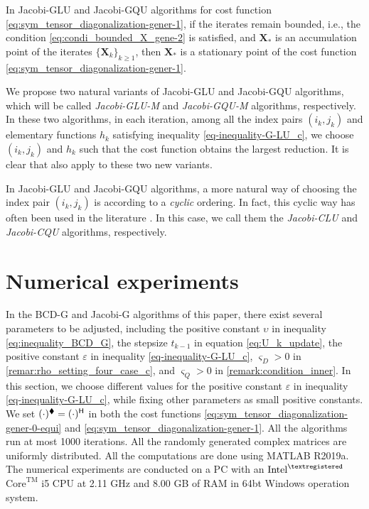 \documentclass[final,onefignum,onetabnum]{siamart190516}
\newcommand{\matr}[1]{\boldsymbol{#1}}
\renewcommand{\H}{{\sf H}} %
\renewcommand{\H}{{\sf H}}      %
\renewcommand{\TH}{{\blacklozenge}}
\begin{document}
\begin{theorem}\label{theorem_main_weak_conv-Jacobi-GLU-09}
In Jacobi-GLU and Jacobi-GQU algorithms for cost function \cref{eq:sym_tensor_diagonalization-gener-1},
if the iterates remain bounded, i.e., the condition \cref{eq:condi_bounded_X_gene-2} is satisfied, 
and $\matr{X}_*$ is an accumulation point of the iterates $\{\matr{X}_{k}\}_{k\ge1}$,
then $\matr{X}_*$ is a stationary point of the cost function \cref{eq:sym_tensor_diagonalization-gener-1}.
\end{theorem}

\begin{remark}\label{subsec:Glu-M}
We propose two natural variants of Jacobi-GLU and Jacobi-GQU algorithms, which will be called \emph{Jacobi-GLU-M} and \emph{Jacobi-GQU-M} algorithms, respectively.
In these two algorithms, in each iteration, among all the index pairs $(i_k,j_k)$ and elementary functions $h_k$ satisfying inequality \cref{eq-inequality-G-LU_c}, 
we choose $(i_k,j_k)$ and $h_k$ such that the cost function obtains the largest reduction.
It is clear that  also apply to these two new variants. 
\end{remark}

\begin{remark}\label{remar:jacobi-c}
In Jacobi-GLU and Jacobi-GQU algorithms, a more natural way of choosing the index pair $(i_k,j_k)$ is according to a \emph{cyclic} ordering.
In fact, this cyclic way has often been used in the literature \cite{maurandi2014decoupled,sorensen2009approximate,wang2012complex}. 
In this case,
we call them the \emph{Jacobi-CLU} and \emph{Jacobi-CQU} algorithms, respectively.  
\end{remark}

\section{Numerical experiments}\label{sec-experiment-hooi}
In the BCD-G and Jacobi-G algorithms of this paper, there exist several parameters to be adjusted, including the positive constant $\upsilon$ in inequality \cref{eq:inequality_BCD_G},  the stepsize $t_{k-1}$ in equation \cref{eq:U_k_update}, the positive constant $\varepsilon$ in inequality \cref{eq-inequality-G-LU_c},  $\varsigma_{D}>0$ in \cref{remar:rho_setting_four_case_c}, and $\varsigma_{Q}>0$ in  \cref{remark:condition_inner}. 
In this section, we choose different values for the positive constant $\varepsilon$ in inequality \cref{eq-inequality-G-LU_c}, while fixing other parameters as small positive constants. 
We set $(\cdot)^\TH = (\cdot)^\H$ in both the cost functions \cref{eq:sym_tensor_diagonalization-gener-0-equi} and \cref{eq:sym_tensor_diagonalization-gener-1}. 
All the algorithms run at most 1000 iterations. All the randomly generated complex matrices are uniformly distributed. 
All the computations are done using MATLAB R2019a. 
The numerical experiments are conducted on a PC with an $\text{Intel}^{\textregistered}$ $\text{Core}^{\text{TM}}$ i5 CPU at 2.11 GHz and 8.00 GB of RAM in 64bt Windows operation system. 
\end{document}
